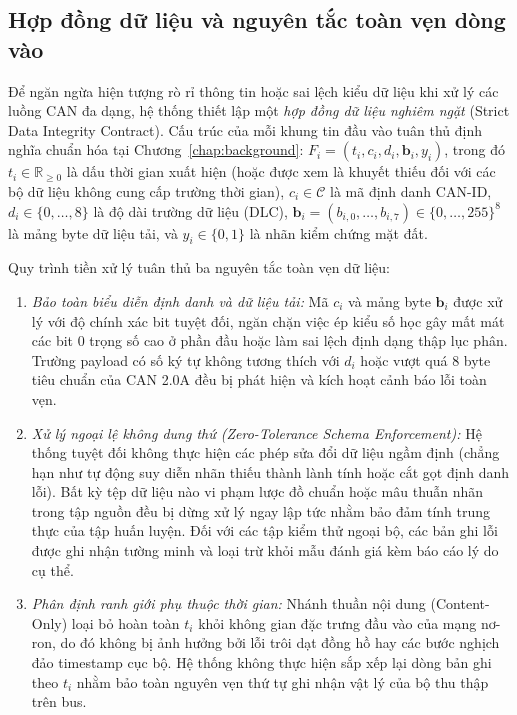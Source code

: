 \documentclass[12pt, a4paper, reqno, oneside]{book}
\begin{document}
\subsection{Hợp đồng dữ liệu và nguyên tắc toàn vẹn dòng vào}
Để ngăn ngừa hiện tượng rò rỉ thông tin hoặc sai lệch kiểu dữ liệu khi xử lý các luồng CAN đa dạng, hệ thống thiết lập một \textit{hợp đồng dữ liệu nghiêm ngặt} (Strict Data Integrity Contract). Cấu trúc của mỗi khung tin đầu vào tuân thủ định nghĩa chuẩn hóa tại Chương~\ref{chap:background}: $F_i = (t_i, c_i, d_i, \mathbf{b}_i, y_i)$, trong đó $t_i \in \mathbb{R}_{\ge 0}$ là dấu thời gian xuất hiện (hoặc được xem là khuyết thiếu đối với các bộ dữ liệu không cung cấp trường thời gian), $c_i \in \mathcal{C}$ là mã định danh CAN-ID, $d_i \in \{0, \ldots, 8\}$ là độ dài trường dữ liệu (DLC), $\mathbf{b}_i = (b_{i,0}, \ldots, b_{i,7}) \in \{0, \ldots, 255\}^8$ là mảng byte dữ liệu tải, và $y_i \in \{0, 1\}$ là nhãn kiểm chứng mặt đất.

Quy trình tiền xử lý tuân thủ ba nguyên tắc toàn vẹn dữ liệu:
\begin{enumerate}
    \item \textit{Bảo toàn biểu diễn định danh và dữ liệu tải:} Mã $c_i$ và mảng byte $\mathbf{b}_i$ được xử lý với độ chính xác bit tuyệt đối, ngăn chặn việc ép kiểu số học gây mất mát các bit 0 trọng số cao ở phần đầu hoặc làm sai lệch định dạng thập lục phân. Trường payload có số ký tự không tương thích với $d_i$ hoặc vượt quá 8 byte tiêu chuẩn của CAN 2.0A đều bị phát hiện và kích hoạt cảnh báo lỗi toàn vẹn.
    \item \textit{Xử lý ngoại lệ không dung thứ (Zero-Tolerance Schema Enforcement):} Hệ thống tuyệt đối không thực hiện các phép sửa đổi dữ liệu ngầm định (chẳng hạn như tự động suy diễn nhãn thiếu thành lành tính hoặc cắt gọt định danh lỗi). Bất kỳ tệp dữ liệu nào vi phạm lược đồ chuẩn hoặc mâu thuẫn nhãn trong tập nguồn đều bị dừng xử lý ngay lập tức nhằm bảo đảm tính trung thực của tập huấn luyện. Đối với các tập kiểm thử ngoại bộ, các bản ghi lỗi được ghi nhận tường minh và loại trừ khỏi mẫu đánh giá kèm báo cáo lý do cụ thể.
    \item \textit{Phân định ranh giới phụ thuộc thời gian:} Nhánh thuần nội dung (Content-Only) loại bỏ hoàn toàn $t_i$ khỏi không gian đặc trưng đầu vào của mạng nơ-ron, do đó không bị ảnh hưởng bởi lỗi trôi dạt đồng hồ hay các bước nghịch đảo timestamp cục bộ. Hệ thống không thực hiện sắp xếp lại dòng bản ghi theo $t_i$ nhằm bảo toàn nguyên vẹn thứ tự ghi nhận vật lý của bộ thu thập trên bus.
\end{enumerate}
\end{document}

